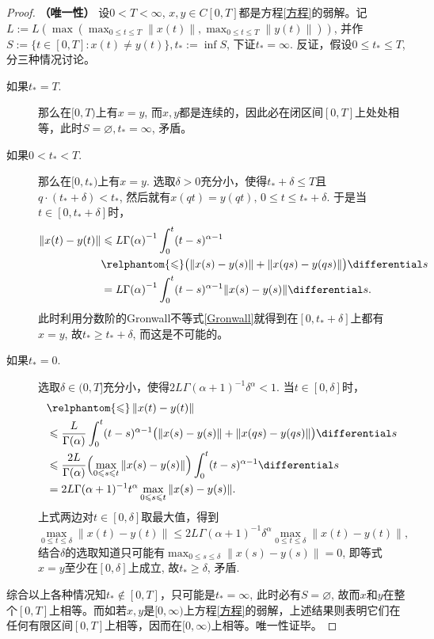 \begin{proof}
    \textbf{（唯一性）} 设$0<T<\infty$, $x,y\in C[0,T]$都是方程\eqref{方程}的弱解。记$L:=L\left(\max\left(\max_{0\leqslant t\leqslant T}\|x(t)\|,\right.\right.\allowbreak\left.\left.\max_{0\leqslant t\leqslant T}\|y(t)\|\right)\right)$, 并作$S:=\{t\in [0,T]\colon x(t)\neq y(t)\},t_*:=\inf S$, 下证$t_*=\infty$. 反证，假设$0\leqslant t_*\leqslant T$, 分三种情况讨论。
    \begin{description}
        \item[如果$t_*=T$.] 那么在$[0,T)$上有$x=y$, 而$x,y$都是连续的，因此必在闭区间$[0,T]$上处处相等，此时$S=\varnothing,t_*=\infty$, 矛盾。
        \item[如果$0<t_*<T$.] 那么在$[0,t_*)$上有$x=y$. 选取$\delta>0$充分小，使得$t_*+\delta\leqslant T$且$q\cdot (t_*+\delta)<t_*$, 然后就有$x(qt)=y(qt),\,0\leqslant t\leqslant t_*+\delta$. 于是当$t\in \left[0,t_*+\delta\right]$时，
        \begin{align*}
            \left\| x(t) - y(t) \right\| & \leqslant {L}{\Gamma(\alpha)}^{-1} \int_0^t (t-s)^{\alpha-1} \\ &\relphantom{\leqslant} \bigl(\|x(s)-y(s)\|+\|x(qs)-y(qs)\|\bigr) \differential s\\
            &={L}{\Gamma(\alpha)}^{-1} \int_0^t (t-s)^{\alpha-1} \|x(s)-y(s)\| \differential s.
        \end{align*}
        此时利用分数阶的Gronwall不等式\cref{Gronwall}就得到在$\left[0,t_*+\delta\right]$上都有$x=y$, 故$t_*\geqslant t_*+\delta$, 而这是不可能的。
        \item[如果$t_*=0$.] 选取$\delta\in (0,T]$充分小，使得$2L\Gamma(\alpha+1)^{-1}\delta^\alpha<1$. 当$t\in[0,\delta]$时，
        \begin{align*}
            &\relphantom{\leqslant}\left\| x(t) - y(t) \right\| \\& \leqslant \frac{L}{\Gamma(\alpha)} \int_0^t (t-s)^{\alpha-1} \bigl(\|x(s)-y(s)\|+\|x(qs)-y(qs)\|\bigr) \differential s\\
            &\leqslant \frac{2L}{\Gamma(\alpha)} \Bigl(\max_{0\leqslant s\leqslant t}\|x(s)-y(s)\|\Bigr) \int_0^t (t-s)^{\alpha-1} \differential s\\
            &=2L\Gamma(\alpha+1)^{-1}t^\alpha \max_{0\leqslant s\leqslant t}\|x(s)-y(s)\|.
        \end{align*}
        上式两边对$t\in[0,\delta]$取最大值，得到
        \begin{equation*}
            \max_{0\leqslant t\leqslant \delta}\|x(t)-y(t)\|\leqslant 2L\Gamma(\alpha+1)^{-1}\delta^\alpha \max_{0\leqslant t\leqslant \delta}\|x(t)-y(t)\|,
        \end{equation*}
        结合$\delta$的选取知道只可能有$\max_{0\leqslant s\leqslant \delta}\|x(s)-y(s)\|=0$, 即等式$x=y$至少在$[0,\delta]$上成立, 故$t_*\geqslant \delta$, 矛盾.
    \end{description}
    综合以上各种情况知$t_*\notin [0,T]$，只可能是$t_*=\infty$, 此时必有$S=\varnothing$, 故而$x$和$y$在整个$[0,T]$上相等。而如若$x,y$是$[0,\infty)$上方程\eqref{方程}的弱解，上述结果则表明它们在任何有限区间$[0,T]$上相等，因而在$[0,\infty)$上相等。唯一性证毕。
\end{proof}